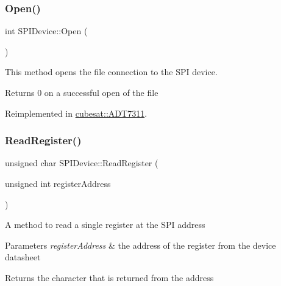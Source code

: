 \subsubsection{\texorpdfstring{Open()}{Open()}}
{\footnotesize\ttfamily int S\+P\+I\+Device\+::\+Open (\begin{DoxyParamCaption}{ }\end{DoxyParamCaption})\hspace{0.3cm}{\ttfamily [virtual]}}

This method opens the file connection to the S\+PI device. \begin{DoxyReturn}{Returns}
0 on a successful open of the file 
\end{DoxyReturn}


Reimplemented in \hyperlink{classcubesat_1_1ADT7311_ac8ddceb62b008effe3f4521bbbe154f7}{cubesat\+::\+A\+D\+T7311}.

\mbox{\label{classcubesat_1_1SPIDevice_ae2630483e262c19ed60c2c6152804e19}} 
\subsubsection{\texorpdfstring{Read\+Register()}{ReadRegister()}}
{\footnotesize\ttfamily unsigned char S\+P\+I\+Device\+::\+Read\+Register (\begin{DoxyParamCaption}\item[{unsigned int}]{register\+Address }\end{DoxyParamCaption})\hspace{0.3cm}{\ttfamily [virtual]}}

A method to read a single register at the S\+PI address 
\begin{DoxyParams}{Parameters}
{\em register\+Address} & the address of the register from the device datasheet \\
\hline
\end{DoxyParams}
\begin{DoxyReturn}{Returns}
the character that is returned from the address 
\end{DoxyReturn}
\mbox{\label{classcubesat_1_1SPIDevice_a6626b40abed0d54522424339b47bbe97}} 

